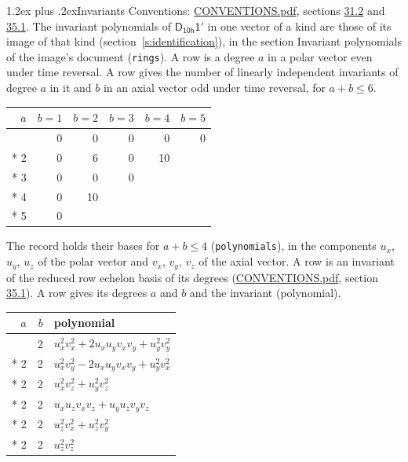 \documentclass[10pt,a4paper]{article}
\makeatletter
\renewcommand\section{\@startsection{section}{1}{\z@}{-3ex plus -1ex minus -.2ex}%
  {1.2ex plus .2ex}{\normalfont\large\sffamily\bfseries\color{parttitle}}}
\numberwithin{equation}{section}
\newcommand{\grp}[1]{\mathsf{#1}}
\makeatother
\begin{document}
\section{Invariants}\label{s:invariants}
Conventions: \href{../../CONVENTIONS.pdf}{CONVENTIONS.pdf}, sections \href{../../CONVENTIONS.pdf\#conv.31.2}{31.2} and \href{../../CONVENTIONS.pdf\#conv.35.1}{35.1}.
The invariant polynomials of $\grp{D_{10h}1'}$ in one vector of a kind are those of its image of that kind (section~\ref{s:identification}), in the section Invariant polynomials of the image's document (\texttt{rings}).
\leavevmode\label{n:index.degree.polar}\label{n:index.degree.axial}A row is a degree $a$ in a polar vector even under time reversal. A row gives the number of linearly independent invariants of degree $a$ in it and $b$ in an axial vector odd under time reversal, for $a + b \le 6$.
{\small\begin{longtable}{@{}rrrrrr@{}}\toprule
$a$ & $b = 1$ & $b = 2$ & $b = 3$ & $b = 4$ & $b = 5$\\\midrule\endhead
\bottomrule\endfoot\endlastfoot
1 & 0 & 0 & 0 & 0 & 0\\*
2 & 0 & 6 & 0 & 10 & \\*
3 & 0 & 0 & 0 &  & \\*
4 & 0 & 10 &  &  & \\*
5 & 0 &  &  &  & \\
\bottomrule\end{longtable}}
\leavevmode\label{n:local.component.polar}\label{n:local.component.axial}The record holds their bases for $a + b \le 4$ (\texttt{polynomials}), in the components $u_{x}$, $u_{y}$, $u_{z}$ of the polar vector and $v_{x}$, $v_{y}$, $v_{z}$ of the axial vector. \label{n:head.polynomial}A row is an invariant of the reduced row echelon basis of its degrees (\href{../../CONVENTIONS.pdf}{CONVENTIONS.pdf}, section \href{../../CONVENTIONS.pdf\#conv.35.1}{35.1}). A row gives its degrees $a$ and $b$ and the invariant (polynomial).
{\small\renewcommand{\arraystretch}{1.2}\begin{longtable}{@{}rrl@{}}\toprule
$a$ & $b$ & polynomial\\\midrule\endhead
\bottomrule\endfoot\endlastfoot
2 & 2 & $u_{x}^{2}v_{x}^{2} + 2u_{x}u_{y}v_{x}v_{y} + u_{y}^{2}v_{y}^{2}$\\*
2 & 2 & $u_{x}^{2}v_{y}^{2} - 2u_{x}u_{y}v_{x}v_{y} + u_{y}^{2}v_{x}^{2}$\\*
2 & 2 & $u_{x}^{2}v_{z}^{2} + u_{y}^{2}v_{z}^{2}$\\*
2 & 2 & $u_{x}u_{z}v_{x}v_{z} + u_{y}u_{z}v_{y}v_{z}$\\*
2 & 2 & $u_{z}^{2}v_{x}^{2} + u_{z}^{2}v_{y}^{2}$\\*
2 & 2 & $u_{z}^{2}v_{z}^{2}$\\
\bottomrule\end{longtable}}
\end{document}
